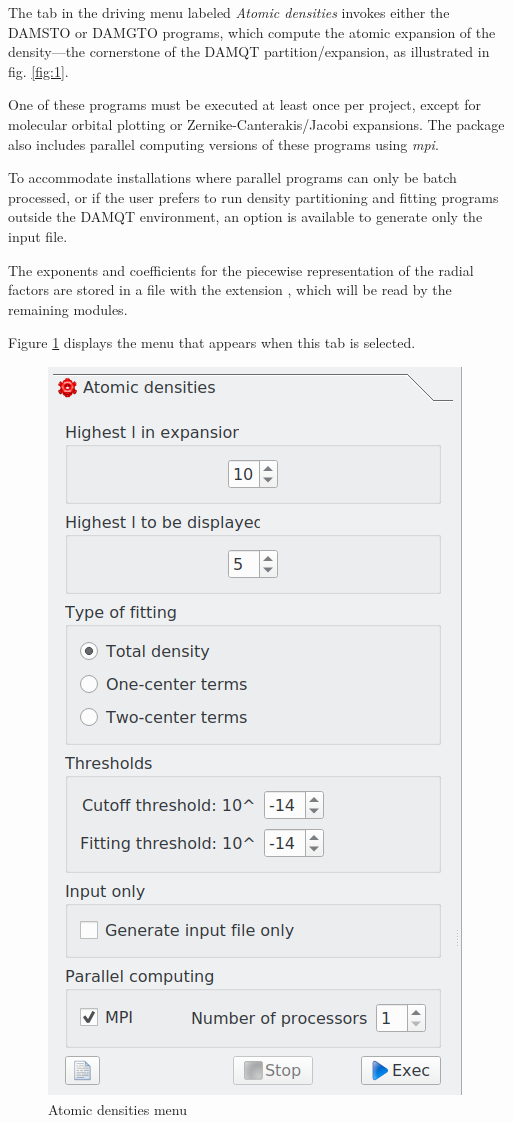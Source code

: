 \documentclass[10pt]{article}
\begin{document}
\begin{center}
\begin{minipage}{.59\linewidth}

The tab in the driving menu labeled {\it Atomic densities} invokes either the DAMSTO or DAMGTO programs,
which compute the atomic expansion of the density—the cornerstone of the DAMQT partition/expansion,
as illustrated in fig. \ref{fig:1}.

One of these programs must be executed at least once per project,
except for molecular orbital plotting or Zernike-Canterakis/Jacobi expansions.
The package also includes parallel computing versions of these programs using {\it mpi}.

To accommodate installations where parallel programs can only be batch processed,
or if the user prefers to run density partitioning and fitting programs
outside the DAMQT environment, an option is available to generate only the input file.

The exponents and coefficients for the piecewise representation of the radial factors
are stored in a file with the extension \damqt{ }, which will be read by the remaining modules.

Figure \ref{fig:2_2_1} displays the menu that appears when this tab is selected.

\end{minipage}
\begin{minipage}{.4\linewidth}

\begin{figure}[H]
\begin{center}
\includegraphics[width=.55\linewidth]{damqt320_atomic_densities.png}
\end{center}
\caption{Atomic densities menu \label{fig:2_2_1}}
\end{figure}

\end{minipage}
\end{center}
\end{document}
